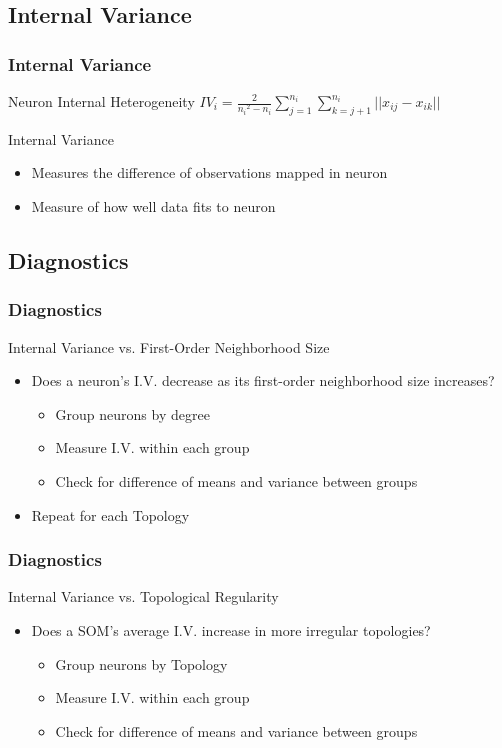 \documentclass[nototal,handout]{beamer}
\begin{document}
\subsection{Internal Variance} 

\begin{frame}
	\frametitle{Internal Variance}
 
\begin{block}{Neuron Internal Heterogeneity}
  \({IV_i} = \frac{2}{{n_i}^2-{n_i}}\sum_{j=1}^{n_i}\sum_{k=j+1}^{n_i} ||{x_{ij}}-{x_{ik}}||\)
 \end{block} 
\begin{block}{Internal Variance}
 \begin{itemize}
 \item  Measures the difference of observations mapped in neuron
 \item  Measure of how well data fits to neuron
 \end{itemize}
 \end{block} \end{frame} 

\subsection{Diagnostics} 

\begin{frame}
	\frametitle{Diagnostics}
 
\begin{block}{Internal Variance vs. First-Order Neighborhood Size}
 \begin{itemize}
 \item  Does a neuron's I.V. decrease as its first-order neighborhood size increases?
 \begin{itemize}
 \item  Group neurons by degree
 \item  Measure I.V. within each group
 \item  Check for difference of means and variance between groups
 \end{itemize}
 \item  Repeat for each Topology
 \end{itemize}
 \end{block} \end{frame} 

\begin{frame}
	\frametitle{Diagnostics}
 
\begin{block}{Internal Variance vs. Topological Regularity}
 \begin{itemize}
 \item  Does a SOM's average I.V. increase in more irregular topologies?
 \begin{itemize}
 \item  Group neurons by Topology
 \item  Measure I.V. within each group
 \item  Check for difference of means and variance between groups
 \end{itemize}
 \end{itemize}
 \end{block} \end{frame} 
\end{document}
